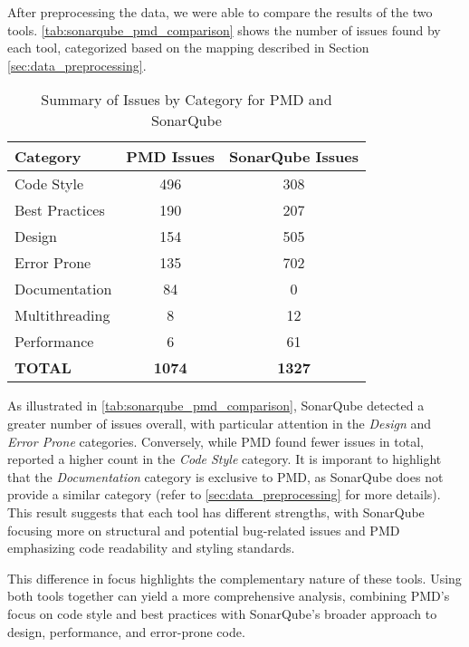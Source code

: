 After preprocessing the data, we were able to compare the results of the two tools. \autoref{tab:sonarqube_pmd_comparison} shows the number of issues found by each tool, categorized based on the mapping described in Section \ref{sec:data_preprocessing}.

\begin{table}[H]
	\centering
	\begin{tabular}{|l|c|c|}
		\hline
		\textbf{Category} & \textbf{PMD Issues} & \textbf{SonarQube Issues} \\
		\hline
		Code Style        & 496                 & 308                       \\
		Best Practices    & 190                 & 207                       \\
		Design            & 154                 & 505                       \\
		Error Prone       & 135                 & 702                       \\
		Documentation     & 84                  & 0                         \\
		Multithreading    & 8                   & 12                        \\
		Performance       & 6                   & 61                        \\
		\textbf{TOTAL}    & \textbf{1074}       & \textbf{1327}             \\
		\hline
	\end{tabular}
	\caption{Summary of Issues by Category for PMD and SonarQube}
	\label{tab:sonarqube_pmd_comparison}
\end{table}

\noindent As illustrated in \autoref{tab:sonarqube_pmd_comparison}, SonarQube detected a greater number of issues overall, with particular attention in the \textit{Design} and \textit{Error Prone} categories. Conversely, while PMD found fewer issues in total, reported a higher count in the \textit{Code Style} category. It is imporant to highlight that the \textit{Documentation} category is exclusive to PMD, as SonarQube does not provide a similar category (refer to \autoref{sec:data_preprocessing} for more details). This result suggests that each tool has different strengths, with SonarQube focusing more on structural and potential bug-related issues and PMD emphasizing code readability and styling standards.

This difference in focus highlights the complementary nature of these tools. Using both tools together can yield a more comprehensive analysis, combining PMD's focus on code style and best practices with SonarQube's broader approach to design, performance, and error-prone code.

